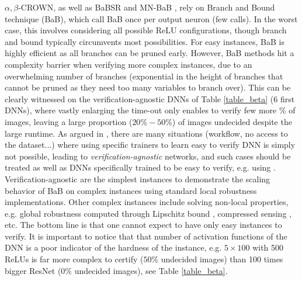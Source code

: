 $\alpha,\beta$-CROWN, as well as BaBSR \cite{BaB} and MN-BaB \cite{ferrari2022complete},
rely on Branch and Bound technique (BaB), which call BaB once per output neuron (few calls). In the worst case, this involves considering all possible ReLU configurations, though branch and bound typically circumvents most possibilities. For easy instances, BaB is highly efficient as all branches can be pruned early. However, BaB methods hit a complexity barrier when verifying more complex instances, due to an overwhelming number of branches (exponential in the height of branches that cannot be pruned as they need too many variables to branch over). This can be clearly witnessed on the verification-agnostic \cite{SDPFI} DNNs of Table \ref{table_beta} (6 first DNNs), where vastly enlarging the time-out only enables to verify few more \% of images, leaving a large proportion ($20\%-50\%$) of images undecided despite the large runtime. As argued in \cite{SDPFI}, there are many situations (workflow, no access to the dataset...) where using specific trainers to learn easy to verify DNN is simply not possible, leading to  {\em verification-agnostic} networks, and such cases should be treated as well as DNNs specifically trained to be easy to verify, e.g. using \cite{TrainingforVerification}. Verification-agnostic are the simplest instances to demonstrate the scaling behavior of BaB on complex instances using standard local robustness implementations. Other complex instances include solving non-local properties, e.g. global robustness computed through Lipschitz bound \cite{lipshitz}, compressed sensing \cite{sensing}, etc. The bottom line is that one cannot expect to have only easy instances to verify. It is important to notice that that number of activation functions of the DNN is a poor indicator of the hardness of the instance, e.g. $5 \times 100$ with 500 ReLUs is far more complex to certify ($50\%$ undecided images) than 100 times bigger ResNet ($0\%$ undecided images), see Table \ref{table_beta}.


